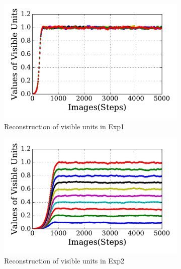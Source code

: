 \begin{figure}
\DIFdelendFL \DIFaddbeginFL \begin{subfigure}[t]{0.48\textwidth}
		\DIFaddendFL \includegraphics[width=\textwidth]{pics_sdlm/30_exp_RBM/exp1_recon_non.pdf}
		\caption{Reconstruction of visible units in Exp1}
	\end{subfigure}
	\DIFdelbeginFL %
\DIFdelendFL \DIFaddbeginFL \begin{subfigure}[t]{0.48\textwidth}
		\DIFaddendFL \includegraphics[width=\textwidth]{pics_sdlm/30_exp_RBM/exp2_recon_non.pdf}
		\caption{Reconstruction of visible units in Exp2}
	\end{subfigure}\\
	\DIFdelbeginFL %
\DIFdelendFL \DIFaddbeginFL \begin{subfigure}[t]{0.48\textwidth}

\end{subfigure}
\end{figure}
